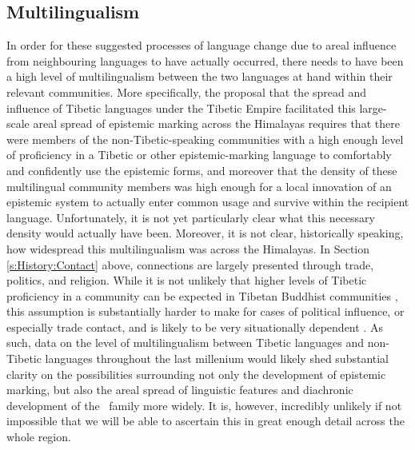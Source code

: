 \subsection{Multilingualism}
In order for these suggested processes of language change due to areal influence from neighbouring languages to have actually occurred, there needs to have been a high level of multilingualism between the two languages at hand within their relevant communities. More specifically, the proposal that the spread and influence of Tibetic languages under the Tibetic Empire facilitated this large-scale areal spread of epistemic marking across the Himalayas requires that there were members of the non-Tibetic-speaking communities with a high enough level of proficiency in a Tibetic or other epistemic-marking language to comfortably and confidently use the epistemic forms, and moreover that the density of these multilingual community members was high enough for a local innovation of an epistemic system to actually enter common usage and survive within the recipient language. Unfortunately, it is not yet particularly clear what this necessary density would actually have been. Moreover, it is not clear, historically speaking, how widespread this multilingualism was across the Himalayas. In Section \ref{s:History:Contact} above, connections are largely presented through trade, politics, and religion. While it is not unlikely that higher levels of Tibetic proficiency in a community can be expected in Tibetan Buddhist communities , this assumption is substantially harder to make for cases of political influence, or especially trade contact, and is likely to be very situationally dependent . As such, data on the level of multilingualism between Tibetic languages and non-Tibetic languages throughout the last millenium would likely shed substantial clarity on the possibilities surrounding not only the development of epistemic marking, but also the areal spread of linguistic features and diachronic development of the \lfam\ family more widely. It is, however, incredibly unlikely if not impossible that we will be able to ascertain this in great enough detail across the whole region.
